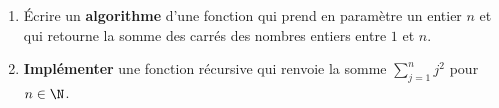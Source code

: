 \begin{boxexstheorieligne}
%




\eexo
\pagebreak[3]



\exo
\vspace{-4mm}\begin{enumerate}[label=\alph*),itemsep=1mm]
\item Écrire un \textbf{algorithme} d'une fonction  qui prend en paramètre un entier $n$ et qui retourne la somme des carrés des nombres entiers entre $1$ et $n$.\vspace{-2mm}
\item \textbf{Implémenter} une fonction récursive  qui renvoie la somme $\displaystyle \sum^{n}_{j=1}j^2$ pour $n\in\N$.


\end{enumerate}
\end{boxexstheorieligne}
